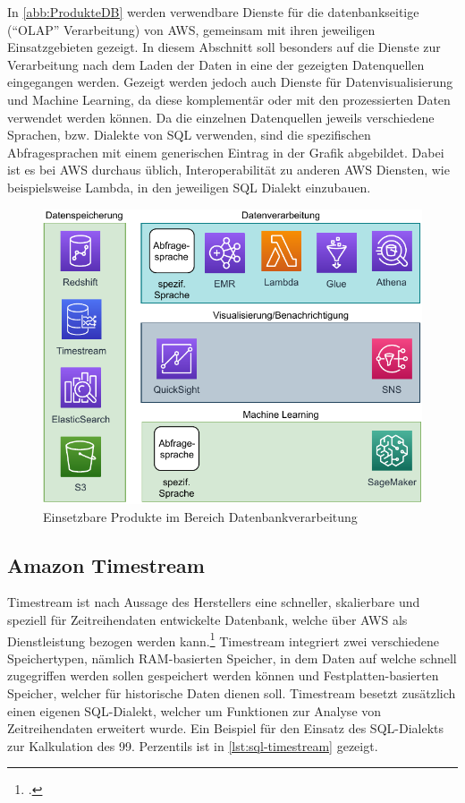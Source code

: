 In \autoref{abb:ProdukteDB} werden verwendbare Dienste für die datenbankseitige (\enquote{\ac{OLAP}} Verarbeitung) von \ac{AWS}, gemeinsam mit ihren jeweiligen Einsatzgebieten gezeigt. In diesem Abschnitt soll besonders auf die Dienste zur Verarbeitung nach dem Laden der Daten in eine der gezeigten Datenquellen eingegangen werden. Gezeigt werden jedoch auch Dienste für Datenvisualisierung und Machine Learning, da diese komplementär oder mit den prozessierten Daten verwendet werden können. Da die einzelnen Datenquellen jeweils verschiedene Sprachen, bzw. Dialekte von \ac{SQL} verwenden, sind die spezifischen Abfragesprachen mit einem generischen Eintrag in der Grafik abgebildet. Dabei ist es bei \ac{AWS} durchaus üblich, Interoperabilität zu anderen \ac{AWS} Diensten, wie beispielsweise Lambda, in den jeweiligen \ac{SQL} Dialekt einzubauen.

\begin{figure}[H]
\centering
\includegraphics[width=\textwidth]{graphics/Overview-DB.pdf}
\caption{Einsetzbare Produkte im Bereich Datenbankverarbeitung}
\label{abb:ProdukteDB}
\end{figure}

\subsection{Amazon Timestream}



Timestream ist nach Aussage des Herstellers eine schneller, skalierbare und speziell für Zeitreihendaten entwickelte Datenbank, welche über \ac{AWS} als Dienstleistung bezogen werden kann.\footcite[Vgl. auch im Folgenden][]{AmazonWebServicesInc..o.J.h} Timestream integriert zwei verschiedene Speichertypen, nämlich \ac{RAM}-basierten Speicher, in dem Daten auf welche schnell zugegriffen werden sollen gespeichert werden können und Festplatten-basierten Speicher, welcher für historische Daten dienen soll.
Timestream besetzt zusätzlich einen eigenen \ac{SQL}-Dialekt, welcher um Funktionen zur Analyse von Zeitreihendaten erweitert wurde. Ein Beispiel für den Einsatz des \ac{SQL}-Dialekts zur Kalkulation des 99. Perzentils ist in \autoref{lst:sql-timestream} gezeigt.
\lstset{language=SQL} 

